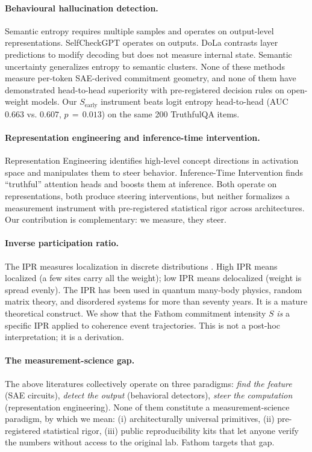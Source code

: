 \documentclass[11pt,letterpaper]{article}
\begin{document}
\paragraph{Behavioural hallucination detection.} Semantic entropy
\citep{farquhar2024semantic} requires multiple samples and operates on
output-level representations. SelfCheckGPT \citep{manakul2023selfcheckgpt}
operates on outputs. DoLa \citep{chuang2024dola} contrasts layer
predictions to modify decoding but does not measure internal state.
Semantic uncertainty \citep{kuhn2023semantic} generalizes
entropy to semantic clusters. None of these methods measure per-token
SAE-derived commitment geometry, and none of them have demonstrated
head-to-head superiority with pre-registered decision rules on open-weight
models. Our $S_{\text{early}}$ instrument beats logit entropy head-to-head
(AUC $0.663$ vs. $0.607$, $p\,=\,0.013$) on the same 200 TruthfulQA items.

\paragraph{Representation engineering and inference-time intervention.}
Representation Engineering \citep{zou2023representation} identifies
high-level concept directions in activation space and manipulates them to
steer behavior. Inference-Time Intervention \citep{li2024iti} finds
``truthful'' attention heads and boosts them at inference. Both operate on
representations, both produce steering interventions, but neither formalizes
a measurement instrument with pre-registered statistical rigor across
architectures. Our contribution is complementary: we measure, they steer.

\paragraph{Inverse participation ratio.} The IPR measures localization in
discrete distributions \citep{anderson1958absence}. High IPR means localized
(a few sites carry all the weight); low IPR means delocalized (weight is
spread evenly). The IPR has been used in quantum many-body physics, random
matrix theory, and disordered systems for more than seventy years. It is
a mature theoretical construct. We show that the Fathom commitment intensity
$S$ \emph{is} a specific IPR applied to coherence event trajectories. This
is not a post-hoc interpretation; it is a derivation.

\paragraph{The measurement-science gap.} The above literatures collectively
operate on three paradigms: \emph{find the feature} (SAE circuits),
\emph{detect the output} (behavioral detectors), \emph{steer the computation}
(representation engineering). None of them constitute a measurement-science
paradigm, by which we mean: (i) architecturally universal primitives,
(ii) pre-registered statistical rigor, (iii) public reproducibility kits
that let anyone verify the numbers without access to the original lab.
Fathom targets that gap.
\end{document}
